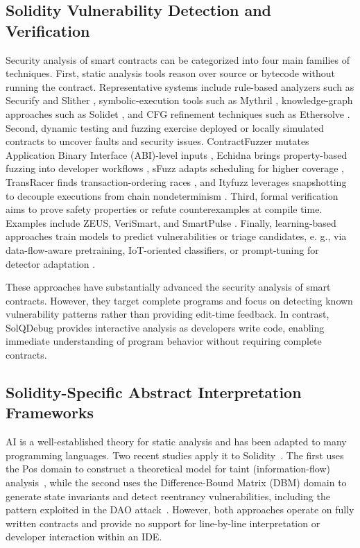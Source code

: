 \documentclass[pdflatex,sn-basic]{sn-jnl}%
\theoremstyle{thmstyleone}%
\theoremstyle{thmstyletwo}%
\theoremstyle{thmstylethree}%
\begin{document}
    \subsection{Solidity Vulnerability Detection and Verification}
        Security analysis of smart contracts can be categorized into four main families of
        techniques.
        First, static analysis tools reason over source or bytecode without running the contract.
        Representative systems include rule-based analyzers such as Securify and Slither
        \citep{securify,slither}, symbolic-execution tools such as Mythril \citep{mythril},
        knowledge-graph approaches such as Solidet \citep{solidet}, and CFG refinement
        techniques such as Ethersolve \citep{ethersolve}.
        Second, dynamic testing and fuzzing exercise deployed or locally simulated contracts to uncover
        faults and security issues.
        ContractFuzzer mutates Application Binary Interface (ABI)-level inputs \citep{confuzz}, Echidna brings property-based
        fuzzing into developer workflows \citep{echidna}, sFuzz adapts scheduling for higher
        coverage \citep{sfuzz}, TransRacer finds transaction-ordering races \citep{transracer}, and
        Ityfuzz leverages snapshotting to decouple executions from chain nondeterminism
        \citep{ityfuzz}.
        Third, formal verification aims to prove safety properties or refute counterexamples at compile
        time. Examples include ZEUS, VeriSmart, and SmartPulse \citep{zeus,verismart,pulse}.
        Finally, learning-based approaches train models to predict vulnerabilities or triage candidates, e.
        g., via data-flow-aware pretraining, IoT-oriented classifiers, or prompt-tuning for detector
        adaptation \citep{peculiar,tmlvd,pscvfinder}.

        These approaches have substantially advanced the security analysis
        of smart contracts. However, they target complete programs and focus on detecting known vulnerability patterns rather than providing edit-time feedback. In contrast, SolQDebug
        provides interactive analysis as developers write code, enabling immediate understanding of program behavior without requiring complete contracts.
    
    \subsection{Solidity-Specific Abstract Interpretation Frameworks}
        AI is a well-established theory for static analysis and has been
        adapted to many programming languages. Two recent studies apply it to Solidity~\citep{flow,
        DBM}. The first uses the Pos domain to construct a theoretical model for taint
        (information-flow) analysis~\citep{flow}, while the second uses the Difference-Bound
        Matrix (DBM) domain to generate state invariants and detect reentrancy vulnerabilities,
        including the pattern exploited in the DAO attack~\citep{DBM, dao}. However, both approaches operate on fully written
        contracts and provide no support for line-by-line interpretation or developer interaction
        within an IDE.
\end{document}
